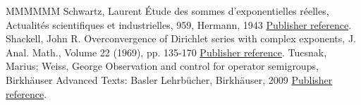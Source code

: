 \begin{thebibliography}{MMMMMM}
 Schwartz, Laurent Étude des sommes d’exponentielles réelles, Actualités scientifiques et industrielles, 959, Hermann, 1943 \href{https://ahl.centre-mersenne.org/item/AHL_2020__3__717_0/#SchwartzThese}{Publisher reference}.
 Shackell, John R. Overconvergence of Dirichlet series with complex exponents, J. Anal. Math., Volume 22 (1969), pp. 135-170 \href{https://ahl.centre-mersenne.org/item/AHL_2020__3__717_0/#Shackell69}{Publisher reference}.
 Tucsnak, Marius; Weiss, George Observation and control for operator semigroups, Birkhäuser Advanced Texts: Basler Lehrbücher, Birkhäuser, 2009 \href{https://ahl.centre-mersenne.org/item/AHL_2020__3__717_0/#TucsnakWeissBook}{Publisher reference}.
\end{thebibliography}
